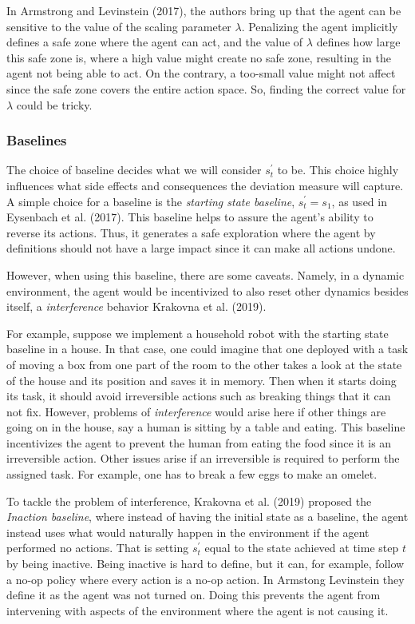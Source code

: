 \documentclass[12pt,A4]{report}
\newcommand{\autobaj}{}
\theoremstyle{definition}
\begin{document}
In Armstrong and Levinstein (2017), the authors bring up that the agent can be sensitive to the value of the scaling parameter $\lambda$. Penalizing the agent implicitly defines a safe zone where the agent can act, and the value of $\lambda$ defines how large this safe zone is, where a high value might create no safe zone, resulting in the agent not being able to act. On the contrary, a too-small value might not affect since the safe zone covers the entire action space. So, finding the correct value for $\lambda$ could be tricky. 

\subsubsection{Baselines}
The choice of baseline decides what we will consider $s^{\prime}_t$ to be. This choice highly influences what side effects and consequences the deviation measure will capture. A simple choice for a baseline is the \textit{starting state baseline}, $s^{\prime}_t = s_1$, as used in Eysenbach et al. (2017). This baseline helps to assure the agent's ability to reverse its actions. Thus, it generates a safe exploration where the agent by definitions should not have a large impact since it can make all actions undone. 

However, when using this baseline, there are some caveats. Namely, in a dynamic environment, the agent would be incentivized to also reset other dynamics besides itself, a \textit{interference} behavior Krakovna et al. (2019). 

For example, suppose we implement a household robot with the starting state baseline in a house. In that case, one could imagine that one deployed with a task of moving a box from one part of the room to the other takes a look at the state of the house and its position and saves it in memory. Then when it starts doing its task, it should avoid irreversible actions such as breaking things that it can not fix. However, problems of \textit{interference} would arise here if other things are going on in the house, say a human is sitting by a table and eating. This baseline incentivizes the agent to prevent the human from eating the food since it is an irreversible action. Other issues arise if an irreversible is required to perform the assigned task. For example, one has to break a few eggs to make an omelet. 

To tackle the problem of interference, Krakovna et al. (2019) proposed the \textit{Inaction baseline}, where instead of having the initial state as a baseline, the agent instead uses what would naturally happen in the environment if the agent performed no actions. That is setting $s^\prime_t$ equal to the state achieved at time step $t$ by being inactive. Being inactive is hard to define, but it can, for example, follow a no-op policy where every action is a no-op action. In \autobaj{Armstong Levinstein} they define it as the agent was not turned on. Doing this prevents the agent from intervening with aspects of the environment where the agent is not causing it.
\end{document}
